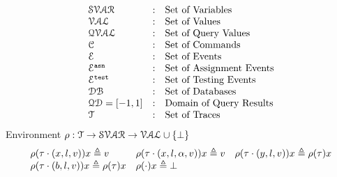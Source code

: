 \[
\begin{array}{lll}
\mathcal{SVAR} & : & \mbox{Set of Variables}  
\\ 
%
\mathcal{VAL} & : & \mbox{Set of Values} 
\\ 
%
\mathcal{QVAL} & : & \mbox{Set of Query Values} 
\\ 
%
\cdom & : & \mbox{Set of Commands} 
\\ 
%
\eventset  & : & \mbox{Set of Events}  
\\
%
\eventset^{\asn}  & : & \mbox{Set of Assignment Events}  
\\
%
\eventset^{\test}  & : & \mbox{Set of Testing Events}  
\\
%
\dbdom  & : & \mbox{{Set of Databases}} 
\\
%
\qdom = {[-1,1]} & : & \mbox{{Domain of Query Results}}
\\
%
{\mathcal{T}} & : & \mbox{Set of Traces}
\end{array}
\]
%
%
%
Environment $ \rho : {\mathcal{T}}  \to \mathcal{SVAR} \to \mathcal{VAL} \cup \{\bot\}$
\[
\begin{array}{lll}
\rho(\mathtt{\tau}  \cdot (x, l, v)) x \triangleq v
&
\rho(\mathtt{\tau} \cdot (x, l, \alpha, v)) x \triangleq v
&
\rho(\mathtt{\tau} \cdot (y, l, v)) x \triangleq \rho(\mathtt{\tau}) x
\\
\rho(\mathtt{\tau} \cdot (b, l, v)) x \triangleq \rho(\mathtt{\tau}) x
&
\rho(\cdot ) x \triangleq \bot
&
\end{array}
\]
%
%
%

%
